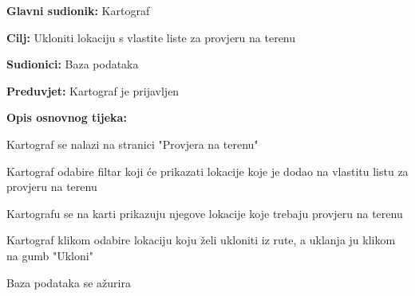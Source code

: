 					\noindent {}
					\begin{packed_item}
	
						\item \textbf{Glavni sudionik: }Kartograf
						\item  \textbf{Cilj:} Ukloniti lokaciju s vlastite liste za provjeru na terenu
						\item  \textbf{Sudionici:} Baza podataka
						\item  \textbf{Preduvjet:} Kartograf je prijavljen
						\item  \textbf{Opis osnovnog tijeka:}
						
						\item[] \begin{packed_enum}
	
							\item Kartograf se nalazi na stranici "Provjera na terenu"
							\item Kartograf odabire filtar koji će prikazati lokacije koje je dodao na vlastitu listu za provjeru na terenu
							\item Kartografu se na karti prikazuju njegove lokacije koje trebaju provjeru na terenu
							\item Kartograf klikom odabire lokaciju koju želi ukloniti iz rute, a uklanja ju klikom na gumb "Ukloni"
							\item Baza podataka se ažurira

						\end{packed_enum}
						
					\end{packed_item}
					

